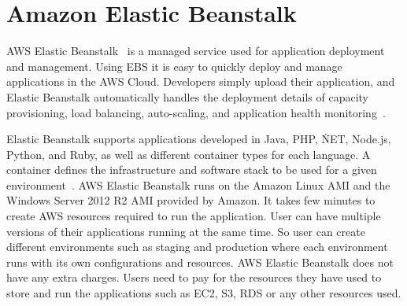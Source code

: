 \section{Amazon Elastic Beanstalk}

AWS Elastic Beanstalk~\cite{hid-sp18-420-amazon-elastic-beanstalk} is a managed service used for
application deployment and management. Using EBS it is easy to quickly deploy
and manage applications in the AWS Cloud. Developers simply upload their
application, and Elastic Beanstalk automatically handles the deployment details
of capacity provisioning, load balancing, auto-scaling, and application health
monitoring~\cite{hid-sp18-420-amazon-elastic-beanstalk-FAQ}.

Elastic Beanstalk supports applications developed in Java, PHP, \.NET, Node.js,
Python, and Ruby, as well as different container types for each language. A
container defines the infrastructure and software stack to be used for a given
environment~\cite{hid-sp18-420-amazon-elastic-beanstalk-FAQ}. AWS Elastic Beanstalk runs on the
Amazon Linux AMI and the Windows Server 2012 R2 AMI provided by Amazon. It takes
few minutes to create AWS resources required to run the application. User can
have multiple versions of their applications running at the same time. So user
can create different environments such as staging and production where each
environment runs with its own configurations and resources. AWS Elastic
Beanstalk does not have any extra charges. Users need to pay for the resources
they have used to store and run the applications such as EC2, S3, RDS or any
other resources used.
